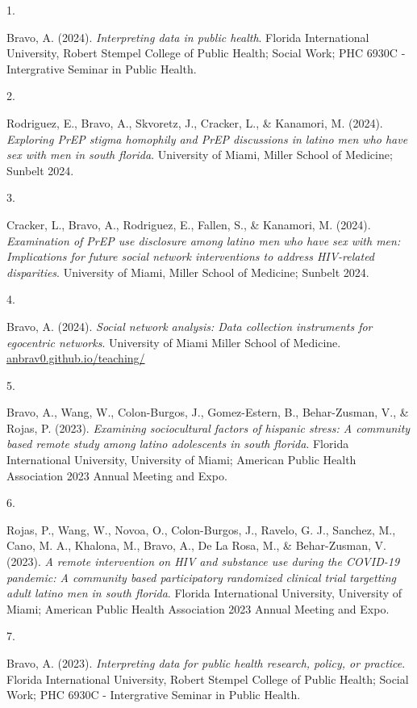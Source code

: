 \documentclass[11pt,a4paper,]{awesome-cv}
\newlength{\cslhangindent}
\newlength{\csllabelwidth}
\newenvironment{CSLReferences}[2] %
 {\begin{list}{}{%
  \setlength{\itemindent}{0pt}
  \setlength{\leftmargin}{0pt}
  \setlength{\parsep}{0pt}
  \ifodd #1
   \setlength{\leftmargin}{\cslhangindent}
   \setlength{\itemindent}{-1\cslhangindent}
  \fi
  \setlength{\itemsep}{#2\baselineskip}}}
 {\end{list}}
\newcommand{\CSLLeftMargin}[1]{\parbox[t]{\csllabelwidth}{\strut#1\strut}}
\newcommand{\CSLRightInline}[1]{\parbox[t]{\linewidth - \csllabelwidth}{\strut#1\strut}}
\begin{document}
\label{refs-01331850270533ca62d5b1e9c1b931f0}
\begin{CSLReferences}{0}{0}
\CSLLeftMargin{1. }%
\CSLRightInline{Bravo, A. (2024). \emph{Interpreting data in public
health}. Florida International University, Robert Stempel College of
Public Health; Social Work; PHC 6930C - Intergrative Seminar in Public
Health.}

\CSLLeftMargin{2. }%
\CSLRightInline{Rodriguez, E., Bravo, A., Skvoretz, J., Cracker, L., \&
Kanamori, M. (2024). \emph{Exploring PrEP stigma homophily and PrEP
discussions in latino men who have sex with men in south florida}.
University of Miami, Miller School of Medicine; Sunbelt 2024.}

\CSLLeftMargin{3. }%
\CSLRightInline{Cracker, L., Bravo, A., Rodriguez, E., Fallen, S., \&
Kanamori, M. (2024). \emph{Examination of PrEP use disclosure among
latino men who have sex with men: Implications for future social network
interventions to address HIV-related disparities}. University of Miami,
Miller School of Medicine; Sunbelt 2024.}

\CSLLeftMargin{4. }%
\CSLRightInline{Bravo, A. (2024). \emph{Social network analysis: Data
collection instruments for egocentric networks}. University of Miami
Miller School of Medicine.
\href{https://anbrav0.github.io/teaching/}{anbrav0.github.io/teaching/}}

\CSLLeftMargin{5. }%
\CSLRightInline{Bravo, A., Wang, W., Colon-Burgos, J., Gomez-Estern, B.,
Behar-Zusman, V., \& Rojas, P. (2023). \emph{Examining sociocultural
factors of hispanic stress: A community based remote study among latino
adolescents in south florida}. Florida International University,
University of Miami; American Public Health Association 2023 Annual
Meeting and Expo.}

\CSLLeftMargin{6. }%
\CSLRightInline{Rojas, P., Wang, W., Novoa, O., Colon-Burgos, J.,
Ravelo, G. J., Sanchez, M., Cano, M. A., Khalona, M., Bravo, A., De La
Rosa, M., \& Behar-Zusman, V. (2023). \emph{A remote intervention on HIV
and substance use during the COVID-19 pandemic: A community based
participatory randomized clinical trial targetting adult latino men in
south florida}. Florida International University, University of Miami;
American Public Health Association 2023 Annual Meeting and Expo.}

\CSLLeftMargin{7. }%
\CSLRightInline{Bravo, A. (2023). \emph{Interpreting data for public
health research, policy, or practice}. Florida International University,
Robert Stempel College of Public Health; Social Work; PHC 6930C -
Intergrative Seminar in Public Health.}

\end{CSLReferences}
\end{document}

